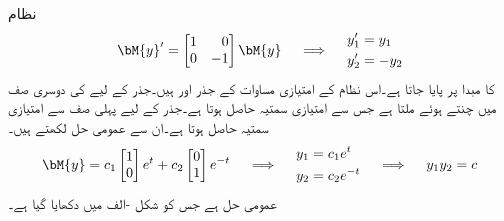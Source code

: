 نظام
\begin{gather}\label{مساوات_نظام_نقطہ_زین}
\begin{aligned}
\bM{y}'=\begin{bmatrix*}[r] 1&0 \\ 0&-1 \end{bmatrix*} \bM{y}
\end{aligned}\quad \implies \quad
\begin{aligned}
y_1'&=y_1\\ 
y_2'&=-y_2
\end{aligned}
\end{gather}
کا  مبدا پر پایا جاتا ہے۔اس نظام کے امتیازی مساوات  کے جذر  اور  ہیں۔جذر  کے لیے  کی  دوسری صف  میں  چنتے ہوئے  ملتا ہے جس سے  امتیازی سمتیہ  حاصل ہوتا ہے۔جذر  کے لیے پہلی  صف سے امتیازی سمتیہ  حاصل ہوتا ہے۔ان سے عمومی حل لکھتے ہیں۔
\begin{gather}
\begin{aligned}
\bM{y}=c_1\begin{bmatrix}1 \\ 0  \end{bmatrix} e^t+c_2\begin{bmatrix}  0\\1 \end{bmatrix} e^{-t}
\end{aligned} \quad \implies\quad
\begin{aligned}
y_1&=c_1e^t\\
y_2&=c_2e^{-t}
\end{aligned}\quad \implies \quad
\begin{aligned}
y_1y_2=c
\end{aligned}
\end{gather}
عمومی حل  ہے جس کو شکل -الف میں دکھایا گیا ہے۔
